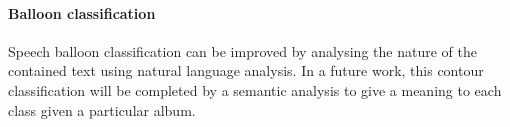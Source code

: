 
\paragraph{Balloon classification} %
\label{par:balloon_classification}
Speech balloon classification can be improved by analysing the nature of the contained text using natural language analysis.
In a future work, this contour classification will be completed by a semantic analysis to give a meaning to each class given a particular album.

